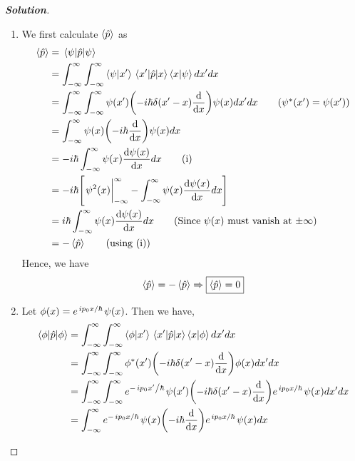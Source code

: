\documentclass[10pt]{scrartcl}
\theoremstyle{definition}
\newenvironment{solution} {\begin{proof}[\normalfont \textbf{Solution}]} {\end{proof}}
\newcommand*{\Op}{\hat{p}}
\begin{document}
\begin{solution}
    $ $
    \begin{enumerate}[label=(\alph*)]
        \item We first calculate $\expval{\Op}$ as
            \begin{align*}
                \expval{\Op} &= \ev{\Op}{\psi} \\ 
                             &= \int_{-\infty}^{\infty} \int_{-\infty}^{\infty} \ip{\psi}{x'} \mel{x'}{\Op}{x} \ip{x}{\psi} dx'dx \\ 
                             &= \int_{-\infty}^{\infty} \int_{-\infty}^{\infty} \psi(x') \qty(-i\hbar \delta(x' - x)\dv{x}) \psi(x) dx'dx \tag{$\psi^*(x') = \psi(x')$}\\ 
                             &= \int_{-\infty}^{\infty} \psi(x) \qty(-i\hbar \dv{x}) \psi(x) dx \\ 
                             &= -i\hbar \int_{-\infty}^{\infty} \psi(x) \dv{\psi(x)}{x} dx \tag{i}\\ 
                             &= -i\hbar \qty[ \eval{\psi^2(x)}_{-\infty}^{\infty} - \int_{-\infty}^{\infty} \psi(x) \dv{\psi(x)}{x} dx] \\ 
                             &= i\hbar \int_{-\infty}^{\infty} \psi(x) \dv{\psi(x)}{x} dx  \tag{Since $\psi(x)$ must vanish at $\pm \infty$}\\
                             &= -\expval{\Op} \tag{using (i)} \\
            \end{align*}
            Hence, we have $$\expval{\Op} = - \expval{\Op} \Rightarrow \boxed{\expval{\Op} = 0}$$
        \item Let $\phi(x) = e^{\flatfrac{ip_0x}{\hbar}}\psi(x)$. Then we have,
            \begin{align*}
                \ev{\Op}{\phi}  &= \int_{-\infty}^{\infty} \int_{-\infty}^{\infty} \ip{\phi}{x'} \mel{x'}{\Op}{x} \ip{x}{\phi} dx'dx \\ 
                                &= \int_{-\infty}^{\infty} \int_{-\infty}^{\infty} \phi^*(x') \qty(-i\hbar \delta(x' - x)\dv{x}) \phi(x) dx'dx \\ 
                                &= \int_{-\infty}^{\infty} \int_{-\infty}^{\infty} e^{-\flatfrac{ip_0x'}{\hbar}}\psi(x') \qty(-i\hbar \delta(x' - x)\dv{x}) e^{\flatfrac{ip_0x}{\hbar}}\psi(x) dx'dx \\ 
                                &= \int_{-\infty}^{\infty}  e^{-\flatfrac{ip_0x}{\hbar}}\psi(x) \qty(-i\hbar \dv{x}) e^{\flatfrac{ip_0x}{\hbar}}\psi(x) dx \\ 

\end{align*}
\end{enumerate}
\end{solution}
\end{document}
